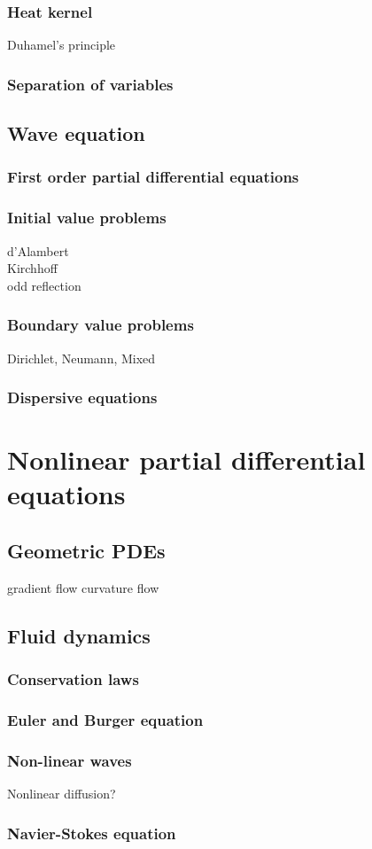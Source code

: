 \documentclass{../../large}
\begin{document}
\section{Heat kernel}
Duhamel's principle
\section{Separation of variables}






\chapter{Wave equation}
\section{First order partial differential equations}
\section{Initial value problems}
d'Alambert\\
Kirchhoff\\
odd reflection

\section{Boundary value problems}
Dirichlet, Neumann, Mixed

\section{Dispersive equations}





\part{Nonlinear partial differential equations}



\chapter{Geometric PDEs}
gradient flow
curvature flow

\chapter{Fluid dynamics}
\section{Conservation laws}
\section{Euler and Burger equation}
\section{Non-linear waves}
Nonlinear diffusion?
\section{Navier-Stokes equation}
\end{document}
